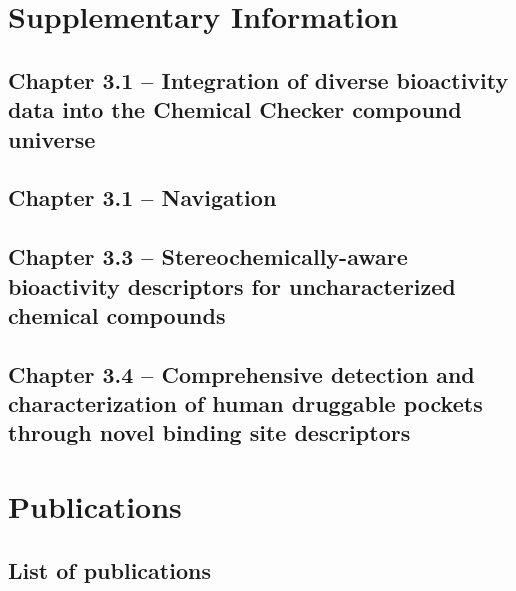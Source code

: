 \titleformat{\section}[block]
  {\normalfont\LARGE\bfseries}{\thesection}{1em}{}


\chapter{Supplementary Information}
\newpage


\clearpage
\section{Chapter 3.1 -- Integration of diverse bioactivity data into the Chemical Checker compound universe}




\clearpage
\section{Chapter 3.1 -- Navigation}



\clearpage
\section{Chapter 3.3 -- Stereochemically-aware bioactivity descriptors for uncharacterized chemical compounds}


\clearpage
\section{Chapter 3.4 -- Comprehensive detection and characterization of human druggable pockets through novel binding site descriptors}




\chapter{Publications}
\newpage
\section{List of publications}
\label{ListOfPublications}

